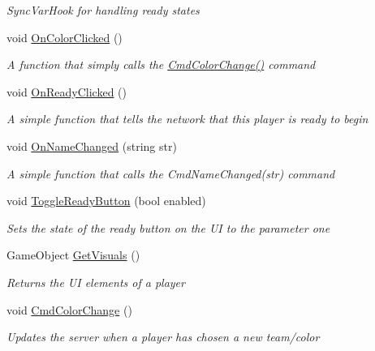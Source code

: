 \begin{DoxyCompactItemize}
\begin{DoxyCompactList}\small\item\em Sync\+Var\+Hook for handling ready states \end{DoxyCompactList}\item 
void \hyperlink{class_d_l_network_lobby_player_aab20faf1b2912c913363f9664c5f57f4}{On\+Color\+Clicked} ()
\begin{DoxyCompactList}\small\item\em A function that simply calls the \hyperlink{class_d_l_network_lobby_player_a53746df370122d632c01e627d97e2d4c}{Cmd\+Color\+Change()} command \end{DoxyCompactList}\item 
void \hyperlink{class_d_l_network_lobby_player_a5703c8531b9d4fd7c6987a9f26c43c5c}{On\+Ready\+Clicked} ()
\begin{DoxyCompactList}\small\item\em A simple function that tells the network that this player is ready to begin \end{DoxyCompactList}\item 
void \hyperlink{class_d_l_network_lobby_player_a3620f9df4e0e691e82287f5bdf12fff4}{On\+Name\+Changed} (string str)
\begin{DoxyCompactList}\small\item\em A simple function that calls the Cmd\+Name\+Changed(str) command \end{DoxyCompactList}\item 
void \hyperlink{class_d_l_network_lobby_player_a1b4e00a130627290eb4e7b281037b07b}{Toggle\+Ready\+Button} (bool enabled)
\begin{DoxyCompactList}\small\item\em Sets the state of the ready button on the UI to the parameter one \end{DoxyCompactList}\item 
Game\+Object \hyperlink{class_d_l_network_lobby_player_a1302ddd493dfe54e7a90780320ff5c92}{Get\+Visuals} ()
\begin{DoxyCompactList}\small\item\em Returns the UI elements of a player \end{DoxyCompactList}\item 
void \hyperlink{class_d_l_network_lobby_player_a53746df370122d632c01e627d97e2d4c}{Cmd\+Color\+Change} ()
\begin{DoxyCompactList}\small\item\em Updates the server when a player has chosen a new team/color \end{DoxyCompactList}\item 

\end{DoxyCompactItemize}

